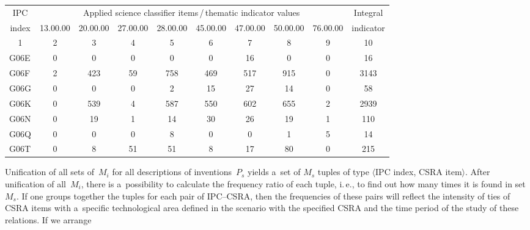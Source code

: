 \begin{multicols}{2}
\begin{table*}
\begin{center}
\begin{tabular}{lccccccccc}
\hline
\multicolumn{1}{c}{IPC} &\multicolumn{8}{c}{Applied science classifier 
items\,/\,thematic indicator values}&Integral\\
\cline{2-9}
\multicolumn{1}{c}{index}&13.00.00&20.00.00&27.00.00&28.00.00&45.00.00&47.00.00&50.00.00&76.00.00& indicator\\
\hline
\multicolumn{1}{c}{1}&2&3&4&5&6&7&8&9&10\\
\hline
G06E&0&\hphantom{99}0&0&\hphantom{9}0&\hphantom{9}0&16&\hphantom{9}0&0&\hphantom{99}16\\
G06F&2&423&59\hphantom{9}&758\hphantom{9}&469\hphantom{9}&517\hphantom{9}&915\hphantom{9}&0&3143\\
G06G&0&\hphantom{99}0&0&\hphantom{9}2&15&27&14&0&\hphantom{99}58\\
G06K&0&539&4&587\hphantom{9}&550\hphantom{9}&602\hphantom{9}&655\hphantom{9}&2&2939\\
G06N&0&\hphantom{9}19&1&14&30&26&19&1&\hphantom{9}110\\
G06Q&0&\hphantom{99}0&0&\hphantom{9}8&\hphantom{9}0&\hphantom{9}0&\hphantom{9}1&5&\hphantom{99}14\\
G06T&0&\hphantom{99}8&51\hphantom{9}&51&\hphantom{9}8&17&80&0&\hphantom{9}215\\
\hline
\end{tabular}
\end{center}
\end{table*}
    
    
    Unification of all sets of~$M_i$ for all descriptions of inventions~$P_s$ yields 
    a~set of $M_s$ tuples of type $\langle$IPC index, CSRA item$\rangle$. After unification 
of all~$M_i$, there is a~possibility to calculate the frequency ratio of each tuple, i.\,e., 
to find out how many times it is found in set~$M_s$. If one groups together the tuples for 
each pair of IPC--CSRA, then the frequencies of these pairs will reflect the intensity of 
ties of CSRA items with a~specific technological area defined in the scenario with 
the specified CSRA and the time period of the study of these relations. If we arrange\linebreak\vspace*{-12pt}
 { \begin{center}  %
 \vspace*{-4pt}
 \mbox{%
\epsfxsize=77.888mm
}


\end{center}

}
\end{multicols}
